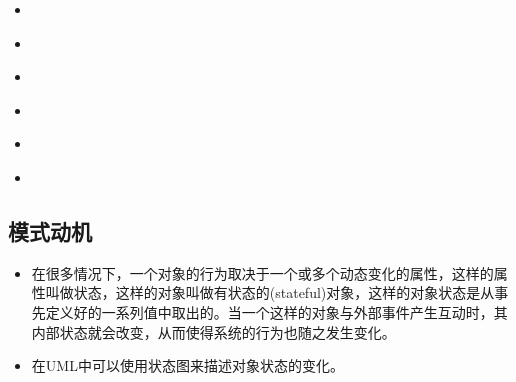 \documentclass[letterpaper,10pt,english]{sphinxmanual}
\begin{document}
\begin{sphinxShadowBox}
\begin{itemize}
\begin{itemize}
\item {} 
\sphinxAtStartPar
{}\label{\detokenize{behavioral_patterns/state:id24}}{\hyperref[\detokenize{behavioral_patterns/state:id10}]{}}

\item {} 
\sphinxAtStartPar
{}\label{\detokenize{behavioral_patterns/state:id25}}{\hyperref[\detokenize{behavioral_patterns/state:id11}]{}}

\item {} 
\sphinxAtStartPar
{}\label{\detokenize{behavioral_patterns/state:id26}}{\hyperref[\detokenize{behavioral_patterns/state:id12}]{}}

\item {} 
\sphinxAtStartPar
{}\label{\detokenize{behavioral_patterns/state:id27}}{\hyperref[\detokenize{behavioral_patterns/state:id13}]{}}

\item {} 
\sphinxAtStartPar
{}\label{\detokenize{behavioral_patterns/state:id28}}{\hyperref[\detokenize{behavioral_patterns/state:id14}]{}}

\item {} 
\sphinxAtStartPar
{}\label{\detokenize{behavioral_patterns/state:id29}}{\hyperref[\detokenize{behavioral_patterns/state:id15}]{}}

\end{itemize}

\end{itemize}
\end{sphinxShadowBox}


\subsection{模式动机}
\label{\detokenize{behavioral_patterns/state:id3}}\begin{itemize}
\item {} 
\sphinxAtStartPar
在很多情况下，一个对象的行为取决于一个或多个动态变化的属性，这样的属性叫做状态，这样的对象叫做有状态的(stateful)对象，这样的对象状态是从事先定义好的一系列值中取出的。当一个这样的对象与外部事件产生互动时，其内部状态就会改变，从而使得系统的行为也随之发生变化。

\item {} 
\sphinxAtStartPar
在UML中可以使用状态图来描述对象状态的变化。

\end{itemize}
\end{document}
